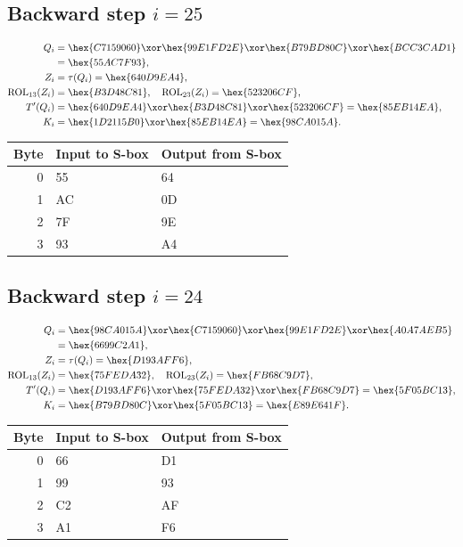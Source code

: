 \subsection*{Backward step $i=25$}
\begin{align*}
Q_i&=\hex{C7159060}\xor\hex{99E1FD2E}\xor\hex{B79BD80C}\xor\hex{BCC3CAD1}\\&=\hex{55AC7F93},\\
Z_i&=\tau(Q_i)=\hex{640D9EA4},\\
\operatorname{ROL}_{13}(Z_i)&=\hex{B3D48C81},\quad\operatorname{ROL}_{23}(Z_i)=\hex{523206CF},\\
T'(Q_i)&=\hex{640D9EA4}\xor\hex{B3D48C81}\xor\hex{523206CF}=\hex{85EB14EA},\\
K_i&=\hex{1D2115B0}\xor\hex{85EB14EA}=\hex{98CA015A}.\end{align*}
\begingroup\small
\begin{longtable}{rll}
\toprule
Byte & Input to S-box & Output from S-box\\\midrule
\endhead
0 & 55 & 64\\
1 & AC & 0D\\
2 & 7F & 9E\\
3 & 93 & A4\\
\bottomrule\end{longtable}
\endgroup
\subsection*{Backward step $i=24$}
\begin{align*}
Q_i&=\hex{98CA015A}\xor\hex{C7159060}\xor\hex{99E1FD2E}\xor\hex{A0A7AEB5}\\&=\hex{6699C2A1},\\
Z_i&=\tau(Q_i)=\hex{D193AFF6},\\
\operatorname{ROL}_{13}(Z_i)&=\hex{75FEDA32},\quad\operatorname{ROL}_{23}(Z_i)=\hex{FB68C9D7},\\
T'(Q_i)&=\hex{D193AFF6}\xor\hex{75FEDA32}\xor\hex{FB68C9D7}=\hex{5F05BC13},\\
K_i&=\hex{B79BD80C}\xor\hex{5F05BC13}=\hex{E89E641F}.\end{align*}
\begingroup\small
\begin{longtable}{rll}
\toprule
Byte & Input to S-box & Output from S-box\\\midrule
\endhead
0 & 66 & D1\\
1 & 99 & 93\\
2 & C2 & AF\\
3 & A1 & F6\\
\bottomrule\end{longtable}
\endgroup
